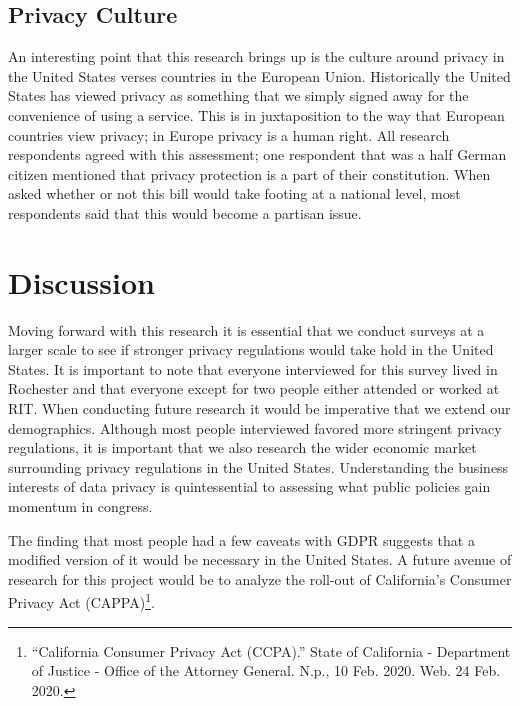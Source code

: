 \documentclass[12pt,
 reprint,
nofootinbib,
 amsmath,amssymb,
 aps,
]{revtex4-2}
\begin{document}
\subsection{\label{sec:level2}Privacy Culture}

An interesting point that this research brings up is the culture around privacy in the United States verses countries in the European Union.
Historically the United States has viewed privacy as something that we simply signed away for the convenience of using a service.
This is in juxtaposition to the way that European countries view privacy; in Europe privacy is a human right.
All research respondents agreed with this assessment; one respondent that was a half German citizen mentioned that privacy protection is a part of their constitution.
When asked whether or not this bill would take footing at a national level, most respondents said that this would become a partisan issue.

\section{\label{sec:level1}Discussion}

Moving forward with this research it is essential that we conduct surveys at a larger scale to see if stronger privacy regulations would take hold in the United States.
It is important to note that everyone interviewed for this survey lived in Rochester and that everyone except for two people either attended or worked at RIT.
When conducting future research it would be imperative that we extend our demographics.
Although most people interviewed favored more stringent privacy regulations, it is important that we also research the wider economic market surrounding privacy regulations in the United States.
Understanding the business interests of data privacy is quintessential to assessing what public policies gain momentum in congress.

The finding that most people had a few caveats with GDPR suggests that a modified version of it would be necessary in the United States.
A future avenue of research for this project would be to analyze the roll-out of California's Consumer Privacy Act (CAPPA)\footnote{“California Consumer Privacy Act (CCPA).” State of California - Department of Justice - Office of the Attorney General. N.p., 10 Feb. 2020. Web. 24 Feb. 2020.}. 


\appendix
\end{document}
